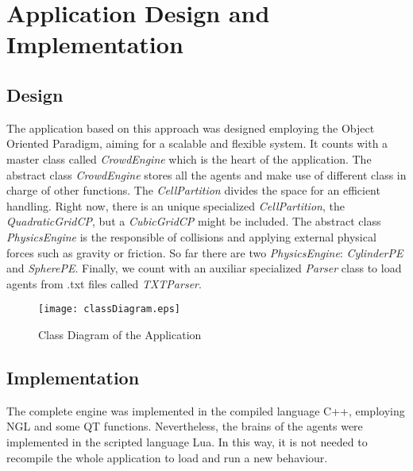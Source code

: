 \ifx\isEmbedded\undefined

\graphicspath{{../img/}}

\fi

\chapter{Application Design and Implementation}
\label{chap:application_design_implementation}

\section{Design}

The application based on this approach was designed employing the Object Oriented Paradigm, aiming for a scalable and flexible system. It counts with a master class called \emph{CrowdEngine} which is the heart of the application. The abstract class \emph{CrowdEngine} stores all the agents and make use of different class in charge of other functions. The \emph{CellPartition} divides the space for an efficient handling. Right now, there is an unique specialized \emph{CellPartition}, the \emph{QuadraticGridCP}, but a \emph{CubicGridCP} might be included. The abstract class \emph{PhysicsEngine} is the responsible of collisions and applying external physical forces such as gravity or friction. So far there are two \emph{PhysicsEngine}: \emph{CylinderPE} and \emph{SpherePE}. Finally, we count with an auxiliar specialized \emph{Parser} class to load agents from .txt files called \emph{TXTParser}.

\begin{landscape}

\begin{figure}[!htb]
  \centering
  \texttt{[image: classDiagram.eps]}
  \caption{Class Diagram of the Application}
  \label{fig:classDiag}
\end{figure}

\end{landscape}

\section{Implementation}
The complete engine was implemented in the compiled language C++, employing NGL and some QT functions. Nevertheless, the brains of the agents were implemented in the scripted language Lua. In this way, it is not needed to recompile the whole application to load and run a new behaviour.

